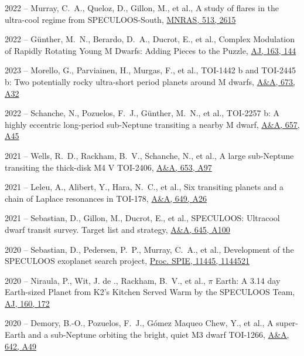 \documentclass[10pt,letterpaper]{article}
\newcommand{\publi}[4]{\item #1 -- #3, #2, #4}
\newcommand{\aj}{AJ}
\newcommand{\mnras}{MNRAS}
\newcommand{\aap}{A\&A}
\newcommand{\procspie}{Proc. SPIE}
\begin{document}
\begin{etaremune}
    \publi{2022}{A study of flares in the ultra-cool regime from SPECULOOS-South}
    {Murray, C.~A., Queloz, D., Gillon, M., et al.}
    {\href{https://ui.adsabs.harvard.edu/abs/2022MNRAS.513.2615M}{\mnras, 513, 2615}}
    
    \publi{2022}{Complex Modulation of Rapidly Rotating Young M Dwarfs: Adding Pieces to the Puzzle}
    {G{\"u}nther, M.~N., Berardo, D.~A., Ducrot, E., et al.}
    {\href{https://ui.adsabs.harvard.edu/abs/2022AJ....163..144G}{\aj, 163, 144}}
    
    \publi{2023}{TOI-1442 b and TOI-2445 b: Two potentially rocky ultra-short period planets around M dwarfs}
    {Morello, G., Parviainen, H., Murgas, F., et al.}
    {\href{https://ui.adsabs.harvard.edu/abs/2023A\&A...673A..32M}{\aap, 673, A32}}
        
    \publi{2022}{TOI-2257 b: A highly eccentric long-period sub-Neptune transiting a nearby M dwarf}
    {Schanche, N., Pozuelos, F.~J., G{\"u}nther, M.~N., et al.}
    {\href{https://ui.adsabs.harvard.edu/abs/2022A\&A...657A..45S}{\aap, 657, A45}}
    
    \publi{2021}{A large sub-Neptune transiting the thick-disk M4 V TOI-2406}
    {Wells, R.~D., Rackham, B.~V., Schanche, N., et al.}
    {\href{https://ui.adsabs.harvard.edu/abs/2021A\&A...653A..97W}{\aap, 653, A97}}
    
    \publi{2021}{Six transiting planets and a chain of Laplace resonances in TOI-178}
    {Leleu, A., Alibert, Y., Hara, N.~C., et al.}
    {\href{https://ui.adsabs.harvard.edu/abs/2021A\&A...649A..26L}{\aap, 649, A26}}
    
    \publi{2021}{SPECULOOS: Ultracool dwarf transit survey. Target list and strategy}
    {Sebastian, D., Gillon, M., Ducrot, E., et al.}
    {\href{https://ui.adsabs.harvard.edu/abs/2021A\&A...645A.100S}{\aap, 645, A100}}
    
    \publi{2020}{Development of the SPECULOOS exoplanet search project}
    {Sebastian, D., Pedersen, P.~P., Murray, C.~A., et al.}
    {\href{https://ui.adsabs.harvard.edu/abs/2020SPIE11445E..21S}{\procspie, 11445, 1144521}}
    
    \publi{2020}{{\ensuremath{\pi}} Earth: A 3.14 day Earth-sized Planet from K2's Kitchen Served Warm by the SPECULOOS Team}
    {Niraula, P., Wit, J. de ., Rackham, B.~V., et al.}
    {\href{https://ui.adsabs.harvard.edu/abs/2020AJ....160..172N}{\aj, 160, 172}}
    
    \publi{2020}{A super-Earth and a sub-Neptune orbiting the bright, quiet M3 dwarf TOI-1266}
    {Demory, B.-O., Pozuelos, F.~J., G{\'o}mez Maqueo Chew, Y., et al.}
    {\href{https://ui.adsabs.harvard.edu/abs/2020A\&A...642A..49D}{\aap, 642, A49}}
    

\end{etaremune}
\end{document}
